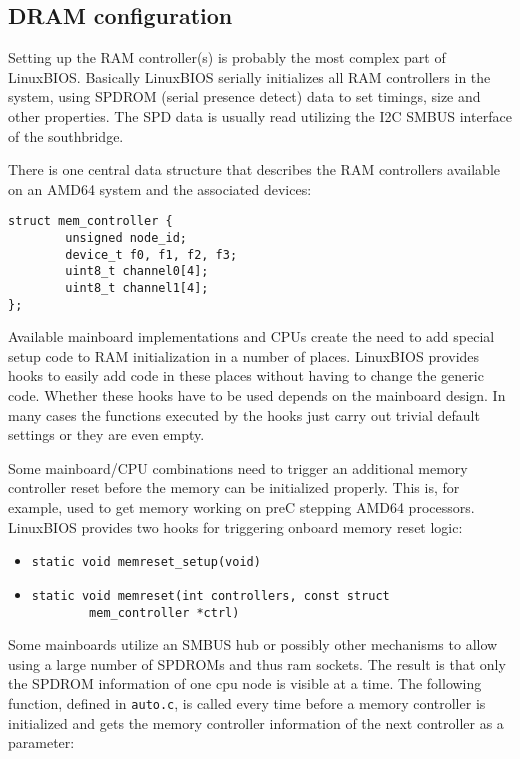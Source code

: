 \documentclass[titlepage,12pt]{article}
\begin{document}
\subsection{DRAM configuration}
Setting up the RAM controller(s) is probably the most complex part of
LinuxBIOS.  Basically LinuxBIOS serially initializes all RAM controllers
in the system, using SPDROM (serial presence detect) data to set
timings, size and other properties.  The SPD data is usually read
utilizing the I2C SMBUS interface of the southbridge.

There is one central data structure that describes the RAM controllers
available on an AMD64 system and the associated devices:

\begin{verbatim}
struct mem_controller {
        unsigned node_id;
        device_t f0, f1, f2, f3;
        uint8_t channel0[4];
        uint8_t channel1[4];
};
\end{verbatim}

Available mainboard implementations and CPUs create the need to add
special setup code to RAM initialization in a number of places.
LinuxBIOS provides hooks to easily add code in these places without
having to change the generic code.  Whether these hooks have to be used
depends on the mainboard design. In many cases the functions executed
by the hooks just carry out trivial default settings or they are even
empty.

Some mainboard/CPU combinations need to trigger an additional memory
controller reset before the memory can be initialized properly. This is,
for example, used to get memory working on preC stepping AMD64
processors. LinuxBIOS provides two hooks for triggering onboard memory
reset logic:

\begin{itemize}
\item \begin{verbatim}static void memreset_setup(void)\end{verbatim}
\item \begin{verbatim}static void memreset(int controllers, const struct
		mem_controller *ctrl)\end{verbatim}
\end{itemize}

Some mainboards utilize an SMBUS hub or possibly other mechanisms to
allow using a large number of SPDROMs and thus ram sockets. The result
is that only the SPDROM information of one cpu node is visible at a
time. The following function, defined in \texttt{auto.c}, is called every time
before a memory controller is initialized and gets the memory controller
information of the next controller as a parameter:
\end{document}
